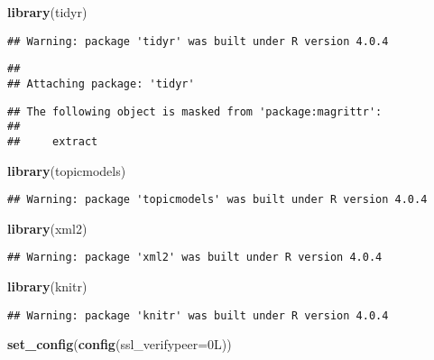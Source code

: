 \documentclass[
]{article}
\newenvironment{Shaded}{\begin{snugshade}}{\end{snugshade}}
\newcommand{\DataTypeTok}[1]{\textcolor[rgb]{0.13,0.29,0.53}{#1}}
\newcommand{\KeywordTok}[1]{\textcolor[rgb]{0.13,0.29,0.53}{\textbf{#1}}}
\newcommand{\NormalTok}[1]{#1}
\begin{document}
\begin{Shaded}
\begin{Highlighting}[]
\KeywordTok{library}\NormalTok{(tidyr)}
\end{Highlighting}
\end{Shaded}

\begin{verbatim}
## Warning: package 'tidyr' was built under R version 4.0.4
\end{verbatim}

\begin{verbatim}
## 
## Attaching package: 'tidyr'
\end{verbatim}

\begin{verbatim}
## The following object is masked from 'package:magrittr':
## 
##     extract
\end{verbatim}

\begin{Shaded}
\begin{Highlighting}[]
\KeywordTok{library}\NormalTok{(topicmodels)}
\end{Highlighting}
\end{Shaded}

\begin{verbatim}
## Warning: package 'topicmodels' was built under R version 4.0.4
\end{verbatim}

\begin{Shaded}
\begin{Highlighting}[]
\KeywordTok{library}\NormalTok{(xml2)}
\end{Highlighting}
\end{Shaded}

\begin{verbatim}
## Warning: package 'xml2' was built under R version 4.0.4
\end{verbatim}

\begin{Shaded}
\begin{Highlighting}[]
\KeywordTok{library}\NormalTok{(knitr)}
\end{Highlighting}
\end{Shaded}

\begin{verbatim}
## Warning: package 'knitr' was built under R version 4.0.4
\end{verbatim}

\begin{Shaded}
\begin{Highlighting}[]
\KeywordTok{set_config}\NormalTok{(}\KeywordTok{config}\NormalTok{(}\DataTypeTok{ssl_verifypeer=}\NormalTok{0L))}
\end{Highlighting}
\end{Shaded}
\end{document}
